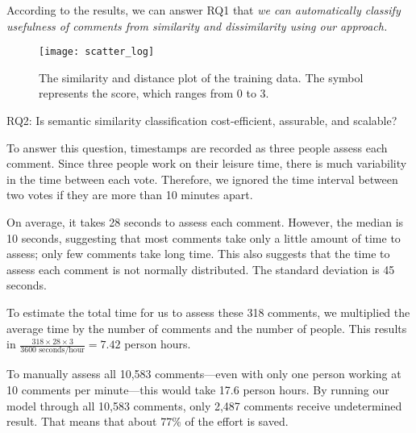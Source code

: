 According to the results, we can answer RQ1 that \emph{we can automatically classify usefulness of comments from similarity and dissimilarity using our approach.}



\begin{figure}[!t]
\centering
\texttt{[image: scatter\_log]}
\caption{The similarity and distance plot of the training data.
The symbol represents the score, which ranges from 0 to 3.}
\label{fig:scatter}
\end{figure}





\begin{ResearchQuestions}
\item[RQ2:] Is semantic similarity classification cost-efficient, assurable, and scalable?
\end{ResearchQuestions}

To answer this question, timestamps are recorded as three people assess each comment.
Since three people work on their leisure time, there is much variability in the time between each vote.
Therefore, we ignored the time interval between two votes if they are more than 10 minutes apart.

On average, it takes 28 seconds to assess each comment.
However, the median is 10 seconds, suggesting that most comments take only a little amount of time to assess; only few comments take long time.
This also suggests that the time to assess each comment is not normally distributed.
The standard deviation is 45 seconds.

To estimate the total time for us to assess these 318 comments,
we multiplied the average time by the number of comments and the number of people.
This results in $\frac{318 \times 28 \times 3}{3600 \text{ seconds/hour}} = 7.42$ person hours.

To manually assess all 10,583 comments---even with only one person working at 10 comments per minute---this would take 17.6 person hours.
By running our model through all 10,583 comments, only 2,487 comments receive undetermined result.
That means that about 77\% of the effort is saved.

















